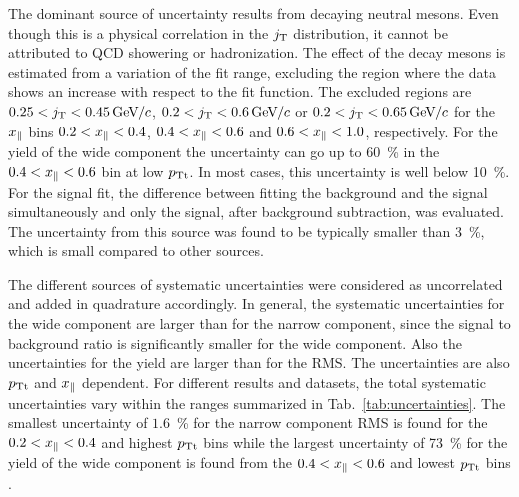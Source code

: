 The dominant source of uncertainty results from decaying neutral mesons. Even though this is a physical correlation in the $j_{\rm T}$ distribution, it cannot be attributed to QCD showering or hadronization. The effect of the decay mesons is estimated from a variation of the fit range, excluding the region where the data shows an increase with respect to the fit function. The excluded regions are $0.25 < j_{\rm T} < 0.45\,\mathrm{GeV}\kern-0.05em/\kern-0.02em c$, $0.2 < j_{\rm T} < 0.6\,\mathrm{GeV}\kern-0.05em/\kern-0.02em c$ or $0.2 < j_{\rm T} < 0.65\,\mathrm{GeV}\kern-0.05em/\kern-0.02em c$ for the $x_{\parallel}$ bins  $0.2 < x_{\parallel} < 0.4$,  $0.4 < x_{\parallel} < 0.6$ and  $0.6 < x_{\parallel} < 1.0$, respectively. For the yield of the wide component the uncertainty can go up to 60~\% in the $0.4 < x_{\parallel} < 0.6$ bin at low $p_{\rm Tt}$. In most cases, this uncertainty is well below 10~\%. For the signal fit, the difference between fitting the background and the signal simultaneously and only the signal, after background subtraction, was evaluated. The uncertainty from this source was found to be typically smaller than 3~\%, which is small compared to other sources.

The different sources of systematic uncertainties were considered as uncorrelated and added in quadrature accordingly. In general, the systematic uncertainties for the wide component are larger than for the narrow component, since the signal to background ratio is significantly smaller for the wide component. Also the uncertainties for the yield are larger than for the RMS. The uncertainties are also $p_{\rm Tt}$ and $x_{\parallel}$ dependent. For different results and datasets, the total systematic uncertainties vary within the ranges summarized in Tab.~\ref{tab:uncertainties}. The smallest uncertainty of $1.6$~\% for the narrow component RMS is found for the $0.2 < x_{\parallel} < 0.4$ and highest $p_{\rm Tt}$ bins while the largest uncertainty of 73~\% for the yield  of the wide component is found from the $0.4 < x_{\parallel} < 0.6$ and lowest $p_{\rm Tt}$ bins .

